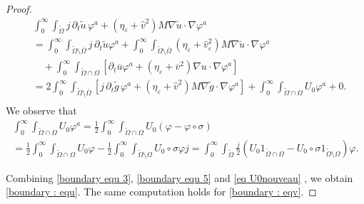 \documentclass[10pt,a4paper]{amsart}
\begin{document}
\begin{proof}
\begin{align}\label{boundary equ 5}
&\int_0^\infty\int_{\widetilde{\Omega}} j\, \partial_t \widetilde{u}\, \varphi^a + (\eta_\varepsilon + \hat{v}^2) M \nabla \tilde{u} \cdot \nabla \varphi^a \nonumber\\
&= \int_0^\infty\int_{\widetilde{\Omega}\setminus \overline{\Omega}} j\, \partial_t \widetilde{u} \varphi^a  + \int_0^\infty\int_{\widetilde{\Omega}\setminus \overline{\Omega}} (\eta_\varepsilon + \hat{v}^2_\varepsilon ) M\nabla \widetilde{u} \cdot \nabla \varphi^a \nonumber\\
&\quad +\int_0^\infty\int_{\widetilde{\Omega}\cap \Omega} \left[\partial_t \overline{u} \varphi^a + (\eta_\varepsilon + \overline{v}^2) \nabla u \cdot \nabla \varphi^a \right] \nonumber\\
&= 2\int_0^\infty\int_{\widetilde{\Omega}\setminus \overline{\Omega}}\left[ j\,\partial_t \widetilde{g} \,\varphi^a +(\eta_\varepsilon + \hat{v}^2)M\nabla \widetilde{g} \cdot \nabla \varphi ^a\right] + \int_0^\infty\int_{\widetilde{\Omega} \cap \Omega} U_0 \varphi^a + 0. \nonumber\\
\end{align}
We observe that
\begin{multline}\label{eq U0nouveau}
\int_0^\infty\int_{\widetilde{\Omega}\cap \Omega} U_0 \varphi^a = \frac{1}{2}\int_0^\infty \int_{\widetilde{\Omega}\cap \Omega} U_0(\varphi - \varphi\circ \sigma)\\
= \frac{1}{2}\int_0^\infty\int_{\widetilde{\Omega}\cap \Omega} U_0\varphi - \frac{1}{2}\int_0^\infty\int_{\widetilde{\Omega}\setminus \Omega} U_0\circ \sigma \varphi j = \int_0^\infty \int_{\widetilde{\Omega}} \frac{j}{2}(U_0 1_{\widetilde{\Omega}\cap \Omega} - U_0\circ \sigma  1_{\widetilde{\Omega}\setminus \Omega})\varphi.
\end{multline}
%

Combining \eqref{boundary equ 3},  \eqref{boundary equ 5} and \eqref{eq U0nouveau} , we obtain \eqref{boundary : equ}. 
The same computation holds for \eqref{boundary : eqv}. 
\end{proof}
\end{document}
